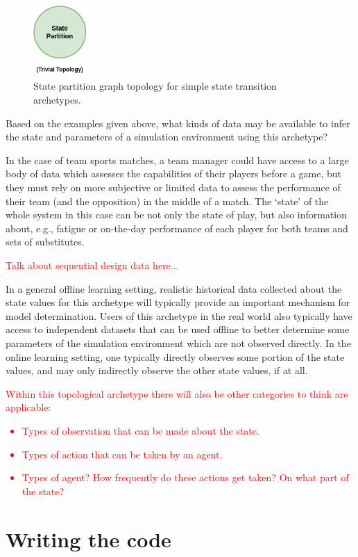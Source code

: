 \begin{figure}[h]
\centering
\includegraphics[width=2cm]{images/chapter-6-state-partition-graph.drawio.png}
\caption{State partition graph topology for simple state transition archetypes.}
\label{fig:state-partition-graph-simple-state-transitions}
\end{figure}

Based on the examples given above, what kinds of data may be available to infer the state and parameters of a simulation environment using this archetype? 

In the case of team sports matches, a team manager could have access to a large body of data which assesses the capabilities of their players before a game, but they must rely on more subjective or limited data to assess the performance of their team (and the opposition) in the middle of a match. The `state' of the whole system in this case can be not only the state of play, but also information about, e.g., fatigue or on-the-day performance of each player for both teams and sets of substitutes. 

\textcolor{red}{Talk about sequential design data here...}

In a general offline learning setting, realistic historical data collected about the state values for this archetype will typically provide an important mechanism for model determination. Users of this archetype in the real world also typically have access to independent datasets that can be used offline to better determine some parameters of the simulation environment which are not observed directly. In the online learning setting, one typically directly observes some portion of the state values, and may only indirectly observe the other state values, if at all.

\textcolor{red}{Within this topological archetype there will also be other categories to think are applicable:
\begin{itemize}
\item{Types of observation that can be made about the state.}
\item{Types of action that can be taken by an agent.}
\item{Types of agent? How frequently do these actions get taken? On what part of the state?}
\end{itemize}
}


\section{\sffamily Writing the code}

